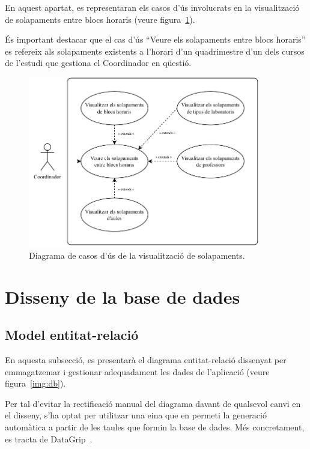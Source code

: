 \documentclass[a4paper,12pt]{ThesisStyle}
\begin{document}
En aquest apartat, es representaran els casos d'ús involucrats en la visualització de solapaments entre blocs horaris (veure figura~\ref{img:casos_us_horaris_solap}).

És important destacar que el cas d'ús ``Veure els solapaments entre blocs horaris'' es refereix als solapaments existents a l'horari d'un quadrimestre d'un dels cursos de l'estudi que gestiona el Coordinador en qüestió.

\begin{figure}[H]
  \centering
  \includegraphics[width=0.9\textwidth]{assets/use_cases/horaris/modificar/solapaments.pdf}
  \caption{\label{img:casos_us_horaris_solap}Diagrama de casos d'ús de la visualització de solapaments.}
\end{figure}

\section{Disseny de la base de dades}
\label{sec:disseny_bdd}

\subsection{Model entitat-relació}
\label{subsec:bd_model_er}

En aquesta subsecció, es presentarà el diagrama entitat-relació dissenyat per emmagatzemar i gestionar adequadament les dades de l'aplicació (veure figura~\ref{img:db}).

Per tal d'evitar la rectificació manual del diagrama davant de qualsevol canvi en el disseny, s'ha optat per utilitzar una eina que en permeti la generació automàtica a partir de les taules que formin la base de dades. Més concretament, es tracta de DataGrip~\cite{DataGrip}.
\end{document}
